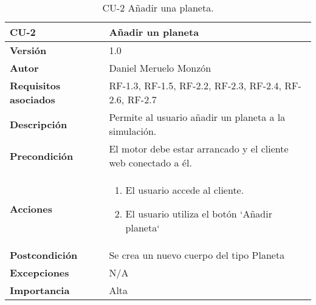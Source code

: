 \begin{table}[p]
	\centering
	\begin{tabularx}{\linewidth}{ p{} p{} }
		\toprule
		\textbf{CU-2}    & \textbf{Añadir un planeta}\\
		\toprule
		\textbf{Versión}              & 1.0    \\
		\textbf{Autor}                & Daniel Meruelo Monzón \\
		\textbf{Requisitos asociados} & RF-1.3, RF-1.5, RF-2.2, RF-2.3, RF-2.4, RF-2.6, RF-2.7 \\
		\textbf{Descripción}          & Permite al usuario añadir un planeta a la simulación. \\
		\textbf{Precondición}         & El motor debe estar arrancado y el cliente web conectado a él. \\
		\textbf{Acciones}             &
		\begin{enumerate}
			\def\labelenumi{\arabic{enumi}.}
			\tightlist
			\item El usuario accede al cliente.
			\item El usuario utiliza el botón `Añadir planeta`
		\end{enumerate}\\
		\textbf{Postcondición}        & Se crea un nuevo cuerpo del tipo Planeta \\
		\textbf{Excepciones}          & N/A \\
		\textbf{Importancia}          & Alta\\
		\bottomrule
	\end{tabularx}
	\caption{CU-2 Añadir una planeta.}
\end{table}
